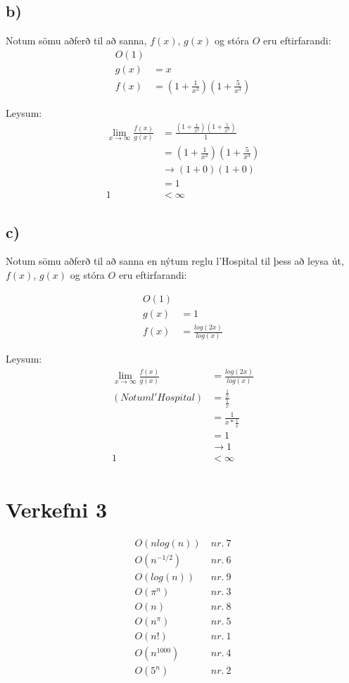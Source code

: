 \documentclass{article}
\begin{document}
\subsection*{b)}
Notum sömu aðferð til að sanna, $f(x)$, $g(x)$ og stóra $O$ eru eftirfarandi:
\begin{align*}
    O(1)\\
    g(x)&=x\\
    f(x)&=(1+\frac{1}{x^2})(1+\frac{5}{x^3})
\end{align*}

Leysum: 
\begin{align*}
    \lim_{x\to\infty} \frac{f(x)}{g(x)}
    &=\frac{(1+\frac{1}{x^2})(1+\frac{5}{x^3})}{1}\\
    &=(1+\frac{1}{x^2})(1+\frac{5}{x^3})\\
    &\to(1+0)(1+0)\\
    &=1\\
    1&<\infty
\end{align*}

\subsection*{c)}
Notum sömu aðferð til að sanna en nýtum reglu l'Hospital til þess að leysa út, $f(x)$, $g(x)$ og stóra $O$ eru eftirfarandi:

\begin{align*}
    O(1)\\
    g(x)&=1\\
    f(x)&=\frac{log(2x)}{log(x)}
\end{align*}

Leysum:
\begin{align*}
    \lim_{x\to\infty} \frac{f(x)}{g(x)}
    &=\frac{log(2x)}{log(x)}\\
    (Notum l'Hospital)&=\frac{\frac{1}{x}}{\frac{1}{x}}\\
    &=\frac{1}{x*\frac{1}{x}}\\
    &=1\\
    &\to1\\
    1&<\infty\\
\end{align*}

\section*{Verkefni 3}
\begin{align*}
   O(nlog(n))\ &nr.\ 7\\
   O(n^{-1/2})\ &nr.\ 6\\
   O(log(n))\ &nr.\ 9\\
   O(\pi^n)\ &nr.\ 3\\
   O(n)\ &nr.\ 8\\
   O(n^\pi)&nr.\ 5\\
   O(n!)\ &nr.\ 1\\
   O(n^{1000})\ &nr.\ 4\\
   O(5^n)\ &nr.\ 2
\end{align*}
\end{document}
